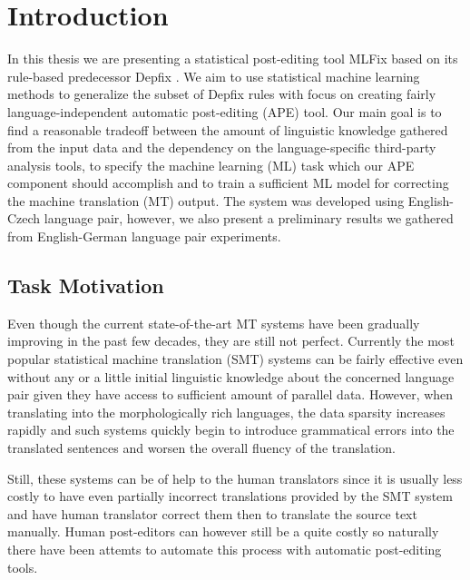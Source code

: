 \chapter{Introduction}

In this thesis we are presenting a statistical post-editing tool MLFix
based on its rule-based predecessor Depfix \citep{depfix:2014}.
We aim to use statistical machine learning methods to generalize the subset of Depfix rules
with focus on creating fairly language-independent automatic post-editing (APE) tool.
Our main goal is to find a reasonable tradeoff between the amount
of linguistic knowledge gathered from the input data and the dependency
on the language-specific third-party analysis tools, to specify the
machine learning (ML) task which our APE component should accomplish and to train
a sufficient ML model for correcting the machine translation (MT) output.
The system was developed using English-Czech language pair, however, we also present
a preliminary results we gathered from English-German language pair experiments.

\section{Task Motivation}

Even though the current state-of-the-art MT systems have been gradually improving in the
past few decades, they are still not perfect. Currently the most popular statistical machine
translation (SMT) systems can be fairly effective even without any or a little initial
linguistic knowledge about the concerned language pair given they have access to sufficient
amount of parallel data. However, when translating into the morphologically rich languages,
the data sparsity increases rapidly and such systems quickly begin to introduce grammatical
errors into the translated sentences and worsen the overall fluency of the translation.

Still, these systems can be of help to the human translators since it is usually less costly
to have even partially incorrect translations provided by the SMT system and have
human translator correct them then to translate the source text manually.
Human post-editors can however still be a quite costly so naturally there have been
attemts to automate this process with automatic post-editing tools.

